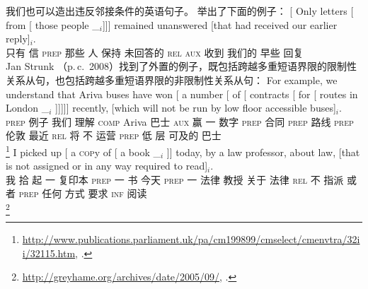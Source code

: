 \noindent
我们也可以造出违反邻接条件的英语句子。 \citet[]{Uszkoreit90a}举出了下面的例子：
\ea
\gll {}[ Only letters [ from          [ those people \_$_i$]]] remained unanswered [that had received our earlier reply]$_i$.\\
     {}          只有   信     {}        \textsc{prep} {}        那些   人     {}        保持      未回答的    \spacebr\textsc{rel} \textsc{aux} 收到 我们的 早些 回复\\
\z
%
Jan Strunk （p.\,c.\, 2008）找到了外置的例子，既包括跨越多重短语界限的限制性关系从句，也包括跨越多重短语界限的非限制性关系从句：
\eal
\ex 
\gll For example, we understand that Ariva buses have won [ a number [ of [ contracts [ for [ routes in London \_$_i$ ]]]]] recently, [which will not be run by low floor accessible buses]$_i$.\\
     \textsc{prep} 例子 我们 理解 \textsc{comp} Ariva 巴士 \textsc{aux} 赢 {} 一 数字 {} \textsc{prep} {} 合同 {} \textsc{prep} {} 路线 \textsc{prep} 伦敦 {} {} 最近 \spacebr\textsc{rel} 将 不 \passive{} 运营 \textsc{prep} 低 层 可及的 巴士\\
\footnote{%
\url{http://www.publications.parliament.uk/pa/cm199899/cmselect/cmenvtra/32ii/32115.htm},
.
}
\ex 
\gll I picked up [ a \textsc{cop}y of [ a book \_$_i$ ]] today, by a law professor, about law, [that is not assigned or in any way required to read]$_i$.\\
我 拾 起 {} 一 复印本 \textsc{prep} {} 一 书 {} {} 今天 \textsc{prep} 一 法律 教授 关于 法律 \spacebr\textsc{rel} \passive{} 不 指派 或者 \textsc{prep} 任何 方式 要求 \textsc{inf} 阅读\\
\footnote{%
\url{http://greyhame.org/archives/date/2005/09/}, .
}
